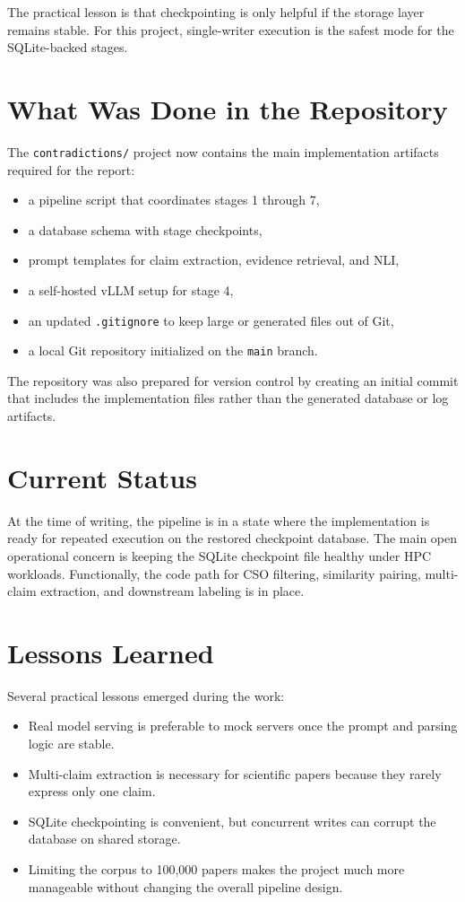 \documentclass[11pt]{article}
\begin{document}
The practical lesson is that checkpointing is only helpful if the storage layer remains stable. For this project, single-writer execution is the safest mode for the SQLite-backed stages.

\section{What Was Done in the Repository}
The \texttt{contradictions/} project now contains the main implementation artifacts required for the report:
\begin{itemize}[noitemsep]
    \item a pipeline script that coordinates stages 1 through 7,
    \item a database schema with stage checkpoints,
    \item prompt templates for claim extraction, evidence retrieval, and NLI,
    \item a self-hosted vLLM setup for stage 4,
    \item an updated \texttt{.gitignore} to keep large or generated files out of Git,
    \item a local Git repository initialized on the \texttt{main} branch.
\end{itemize}

The repository was also prepared for version control by creating an initial commit that includes the implementation files rather than the generated database or log artifacts.

\section{Current Status}
At the time of writing, the pipeline is in a state where the implementation is ready for repeated execution on the restored checkpoint database. The main open operational concern is keeping the SQLite checkpoint file healthy under HPC workloads. Functionally, the code path for CSO filtering, similarity pairing, multi-claim extraction, and downstream labeling is in place.

\section{Lessons Learned}
Several practical lessons emerged during the work:
\begin{itemize}[noitemsep]
    \item Real model serving is preferable to mock servers once the prompt and parsing logic are stable.
    \item Multi-claim extraction is necessary for scientific papers because they rarely express only one claim.
    \item SQLite checkpointing is convenient, but concurrent writes can corrupt the database on shared storage.
    \item Limiting the corpus to 100{,}000 papers makes the project much more manageable without changing the overall pipeline design.
\end{itemize}
\end{document}
